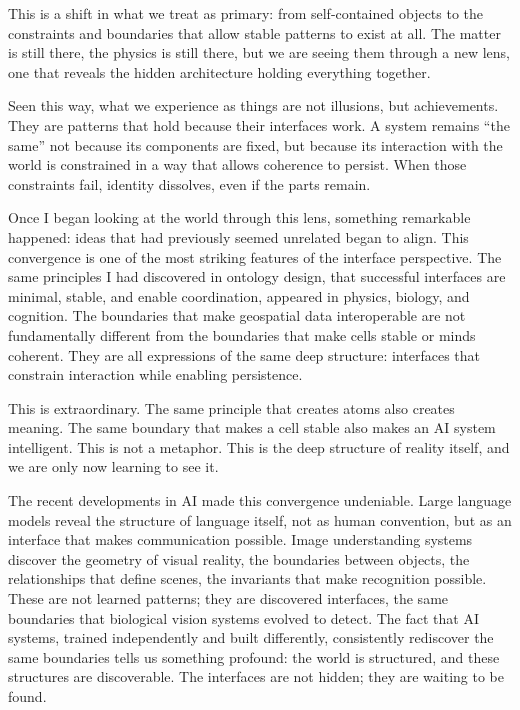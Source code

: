 \documentclass[
  openright]{book}
\begin{document}
\vspace{0.5\baselineskip}

This is a shift in what we treat as primary: from self-contained objects
to the constraints and boundaries that allow stable patterns to exist at
all. The matter is still there, the physics is still there, but we are
seeing them through a new lens, one that reveals the hidden architecture
holding everything together.

Seen this way, what we experience as things are not illusions, but
achievements. They are patterns that hold because their interfaces work.
A system remains ``the same'' not because its components are fixed, but
because its interaction with the world is constrained in a way that
allows coherence to persist. When those constraints fail, identity
dissolves, even if the parts remain.

Once I began looking at the world through this lens, something
remarkable happened: ideas that had previously seemed unrelated began to
align. This convergence is one of the most striking features of the
interface perspective. The same principles I had discovered in ontology
design, that successful interfaces are minimal, stable, and enable
coordination, appeared in physics, biology, and cognition. The
boundaries that make geospatial data interoperable are not fundamentally
different from the boundaries that make cells stable or minds coherent.
They are all expressions of the same deep structure: interfaces that
constrain interaction while enabling persistence.

This is extraordinary. The same principle that creates atoms also
creates meaning. The same boundary that makes a cell stable also makes
an AI system intelligent. This is not a metaphor. This is the deep
structure of reality itself, and we are only now learning to see it.

The recent developments in AI made this convergence undeniable. Large
language models reveal the structure of language itself, not as human
convention, but as an interface that makes communication possible. Image
understanding systems discover the geometry of visual reality, the
boundaries between objects, the relationships that define scenes, the
invariants that make recognition possible. These are not learned
patterns; they are discovered interfaces, the same boundaries that
biological vision systems evolved to detect. The fact that AI systems,
trained independently and built differently, consistently rediscover the
same boundaries tells us something profound: the world is structured,
and these structures are discoverable. The interfaces are not hidden;
they are waiting to be found.
\end{document}
